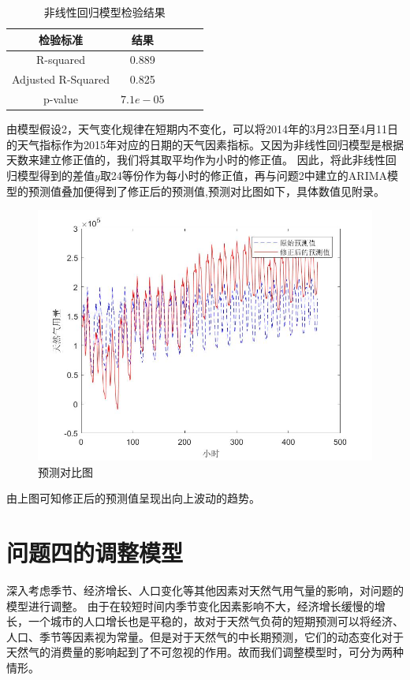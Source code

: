 \documentclass{whutmod}
\begin{document}
	\begin{table}[H]
		\caption{非线性回归模型检验结果}\label{tab001} \centering
		\begin{tabular}{ccccc}
			\toprule[1.5pt]
			检验标准 & 结果 \\
			\midrule[1pt]
		R-squared & 0.889 \\
		Adjusted R-Squared& 0.825 \\
		 p-value & $7.1e-05$\\
			\bottomrule[1.5pt]
		\end{tabular}
	\end{table}
	由模型假设2，天气变化规律在短期内不变化，可以将2014年的3月23日至4月11日的天气指标作为2015年对应的日期的天气因素指标。又因为非线性回归模型是根据天数来建立修正值的，我们将其取平均作为小时的修正值。
	因此，将此非线性回归模型得到的差值$y$取24等份作为每小时的修正值，再与问题2中建立的ARIMA模型的预测值叠加便得到了修正后的预测值,预测对比图如下，具体数值见附录。
		\begin{figure}[H]
			\centering
			\includegraphics[width=\textwidth]{figures/hgfx3.jpg}
			\caption{预测对比图}\label{img003}
		\end{figure}	
由上图可知修正后的预测值呈现出向上波动的趋势。	
	\section{问题四的调整模型}
	
	深入考虑季节、经济增长、人口变化等其他因素对天然气用气量的影响，对问题的模型进行调整。	由于在较短时间内季节变化因素影响不大，经济增长缓慢的增长，一个城市的人口增长也是平稳的，故对于天然气负荷的短期预测可以将经济、人口、季节等因素视为常量。但是对于天然气的中长期预测，它们的动态变化对于天然气的消费量的影响起到了不可忽视的作用。故而我们调整模型时，可分为两种情形。
	
\end{document}
